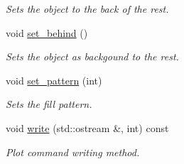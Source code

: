 \begin{DoxyCompactItemize}
\begin{DoxyCompactList}\small\item\em Sets the object to the back of the rest. \end{DoxyCompactList}\item 
\hypertarget{a00429_a52803d17ba9653b47a8acf44106142bf}{}void \hyperlink{a00429_a52803d17ba9653b47a8acf44106142bf}{set\+\_\+behind} ()\label{a00429_a52803d17ba9653b47a8acf44106142bf}

\begin{DoxyCompactList}\small\item\em Sets the object as backgound to the rest. \end{DoxyCompactList}\item 
\hypertarget{a00429_a8ac5b26f0527a012c8b7e93e0ee1de59}{}void \hyperlink{a00429_a8ac5b26f0527a012c8b7e93e0ee1de59}{set\+\_\+pattern} (int)\label{a00429_a8ac5b26f0527a012c8b7e93e0ee1de59}

\begin{DoxyCompactList}\small\item\em Sets the fill pattern. \end{DoxyCompactList}\item 
\hypertarget{a00429_a76abc2061c6608c1f6fb1c3ebcece64c}{}void \hyperlink{a00429_a76abc2061c6608c1f6fb1c3ebcece64c}{write} (std\+::ostream \&, int) const \label{a00429_a76abc2061c6608c1f6fb1c3ebcece64c}

\begin{DoxyCompactList}\small\item\em Plot command writing method. \end{DoxyCompactList}\end{DoxyCompactItemize}
